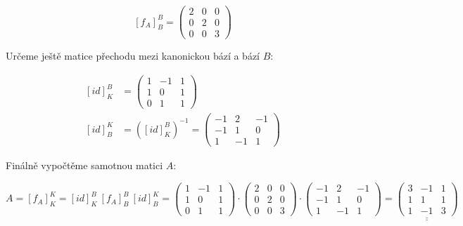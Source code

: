 \documentclass[12pt]{article}
\begin{document}
\[
  \left[f_A\right]^B_B = \left(\begin{array}{ccc}
    2 & 0 & 0 \\ 0 & 2 & 0 \\ 0 & 0 & 3
  \end{array}\right)
\]

Určeme ještě matice přechodu mezi kanonickou bází a bází $B$:

\begin{align*}
  \left[id\right]^B_K &= \left(\begin{array}{ccc}
    1 & -1 & 1 \\
    1 & 0 & 1 \\
    0 & 1 & 1
  \end{array}\right) \\
  \left[id\right]^K_B &=\left(\left[id\right]^B_K\right)^{-1} = \left(\begin{array}{ccc}
    -1&2&-1\\
    -1&1&0\\
    1&-1&1
  \end{array}\right)
\end{align*}

Finálně vypočtěme samotnou matici $A$:

\[
  A = [f_A]^K_K = \left[id\right]^B_K\ [f_A]^B_B \ \left[id\right]^K_B
  = \left(\begin{array}{ccc}
    1 & -1 & 1 \\
    1 & 0 & 1 \\
    0 & 1 & 1
  \end{array}\right) \cdot \left(\begin{array}{ccc}
    2 & 0 & 0 \\ 0 & 2 & 0 \\ 0 & 0 & 3
  \end{array}\right) \cdot \left(\begin{array}{ccc}
    -1&2&-1\\
    -1&1&0\\
    1&-1&1
  \end{array}\right) = \underline{\underline{\left(\begin{array}{ccc}
    3 & -1 & 1 \\ 1 & 1 & 1 \\ 1 & -1 & 3
  \end{array}\right)}}
\]
\end{document}
